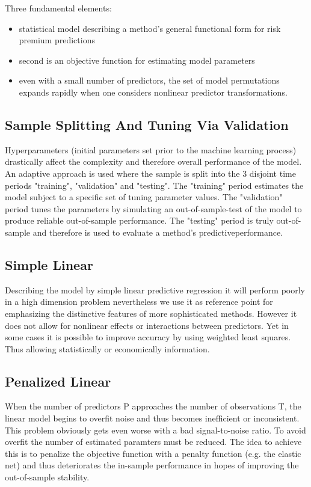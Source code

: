 \documentclass[12pt,a4paper,oneside]{book}
\begin{document}
Three fundamental elements:
\begin{itemize}
\item statistical model describing a method’s general functional form for risk premium
predictions
\item second is an objective function for estimating model parameters
\item even with a small number of predictors, the set of model permutations expands rapidly when one considers nonlinear predictor
transformations.
\end{itemize}

\subsection{Sample Splitting And Tuning Via Validation}
	Hyperparameters (initial parameters set prior to the machine learning process)
	drastically affect the complexity and therefore overall performance of the model.
	An adaptive approach is used where the sample is split into the 3 disjoint time periods
	"training", "validation" and "testing". The "training" period estimates the model
	subject to a specific set of tuning parameter values. The "validation" period
	tunes the parameters by simulating an out-of-sample-test of the model
	to produce reliable out-of-sample performance. The "testing" period is truly
	out-of-sample and therefore is used to evaluate a method’s predictiveperformance.

\subsection{Simple Linear}
	Describing the model by simple linear predictive regression it will perform poorly in a high 
	dimension problem nevertheless we use it as reference point for emphasizing the distinctive 
	features of more sophisticated methods.
	However it does not allow for nonlinear effects or interactions between predictors.
	Yet in some cases it is possible to improve accuracy by using weighted least squares.
	Thus allowing statistically or economically information.
	
\subsection{Penalized Linear}
	When the number of predictors P approaches the number of observations T,
	the linear model begins to overfit noise and thus becomes inefficient or inconsistent.
	This problem obviously gets even worse with a bad signal-to-noise ratio.
	To avoid overfit the number of estimated paramters must be reduced.
	The idea to achieve this is to penalize the objective function with a penalty
	function (e.g. the elastic net) and thus deteriorates the in-sample performance
	in hopes of improving the out-of-sample stability.
\end{document}
